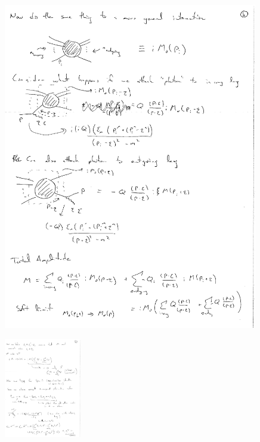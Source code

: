 {\begin{figure}[h]
\includegraphics[width=0.99\textwidth]{./outgoingPhoton.pdf}
\end{figure}


\begin{figure}[h]
\includegraphics[width=0.3\textwidth]{./gravitonVertex.pdf}
\end{figure}



}


